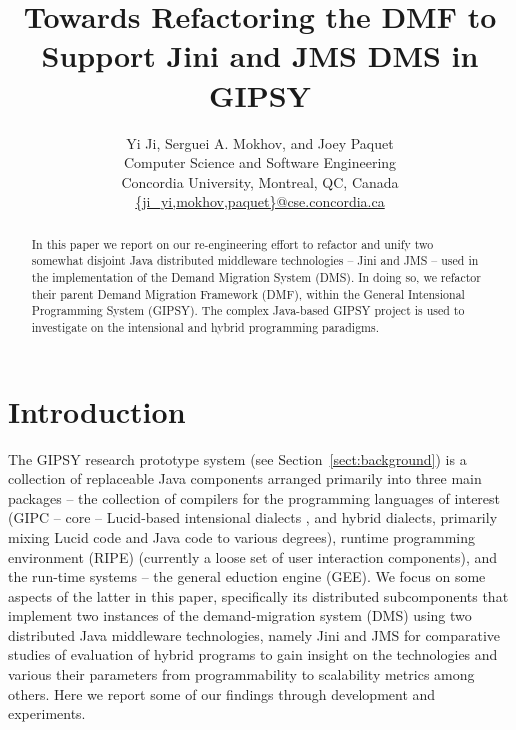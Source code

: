 \documentclass{easychair}
\newcommand{\xs}[1]{Section~\ref{#1}}
\newcommand{\jini}{{Jini\index{Jini}}}
\newcommand{\gipsy}{{GIPSY\index{GIPSY}}}
\newcommand{\dms}{{DMS\index{DMS}}}
\newcommand{\jms}{{JMS\index{JMS}}}
\begin{document}
\title{Towards Refactoring the DMF to Support {\jini} and JMS {\dms} in {\gipsy}}

\author
{
	Yi Ji, Serguei A. Mokhov, and Joey Paquet\\
	Computer Science and Software Engineering\\
	Concordia University, Montreal, QC, Canada\\
	\url{{ji_yi,mokhov,paquet}@cse.concordia.ca}
}


\maketitle


\begin{abstract}
In this paper we report on our re-engineering effort to refactor and unify
two somewhat disjoint Java distributed middleware technologies -- {\jini} and {\jms} --
used in the implementation of the Demand Migration System (DMS).
In doing so, we refactor their parent Demand Migration Framework (DMF), within
the General Intensional Programming System ({\gipsy}).
The complex Java-based {\gipsy} project is used to investigate on the
intensional and hybrid programming paradigms.
\end{abstract}





\section{Introduction}
\label{sect:introduction}

The {\gipsy} research prototype system \cite{gipsy} (see \xs{sect:background})
is a collection of replaceable Java components arranged primarily
into three main packages -- the collection of compilers for the programming
languages of interest (GIPC -- core -- Lucid-based intensional dialects \cite{lucid95}, and
hybrid dialects, primarily mixing Lucid code and Java code to various degrees),
runtime programming environment (RIPE) (currently a loose set of user interaction
components), and the run-time systems -- the general eduction engine (GEE).
We focus on some aspects of the latter in this paper, specifically its distributed
subcomponents that implement two instances of the demand-migration system (DMS)
using two distributed Java middleware technologies, namely Jini and JMS for
comparative studies of evaluation of hybrid programs to gain insight on the
technologies and various their parameters from programmability to scalability
metrics among others. Here we report some of our findings through development
and experiments.
\end{document}
